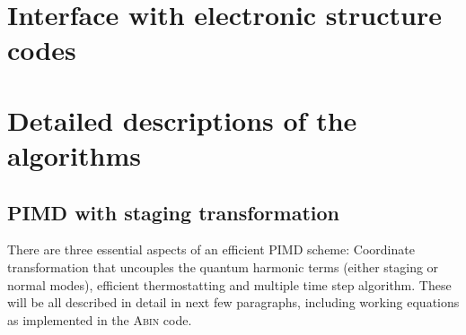 \documentclass[12pt,a4paper]{article}
\begin{document}
%

\section{Interface with electronic structure codes}

\section{Detailed descriptions of the algorithms}
\subsection{PIMD with staging transformation}
There are three essential aspects of an efficient PIMD scheme: Coordinate transformation that uncouples the quantum harmonic terms (either staging or normal modes), efficient thermostatting and multiple time step algorithm. These will be all described in detail in next few paragraphs, including working equations as implemented in the \textsc{Abin} code.
\end{document}
